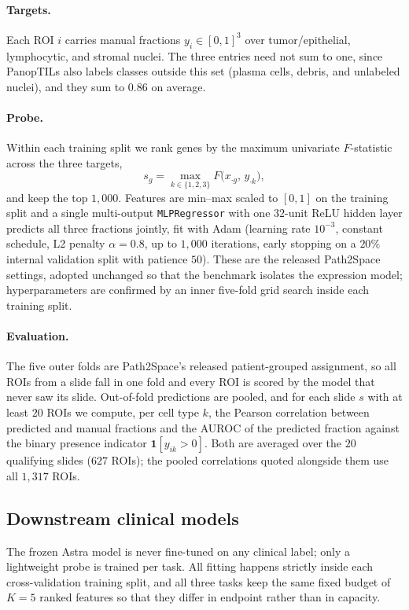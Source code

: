 \documentclass[11pt]{article}
\begin{document}
\paragraph{Targets.} Each ROI $i$ carries manual fractions
$y_i\in[0,1]^3$ over tumor/epithelial, lymphocytic, and stromal nuclei. The three
entries need not sum to one, since PanopTILs also labels classes outside this set
(plasma cells, debris, and unlabeled nuclei), and they sum to $0.86$ on average.

\paragraph{Probe.} Within each training split we rank genes by the maximum
univariate $F$-statistic across the three targets,
\[
s_g=\max_{k\in\{1,2,3\}} F\big(x_{\cdot g},\,y_{\cdot k}\big),
\]
and keep the top $1{,}000$. Features are min--max scaled to $[0,1]$ on the
training split and a single multi-output \texttt{MLPRegressor} with one
$32$-unit ReLU hidden layer predicts all three fractions jointly, fit with Adam
(learning rate $10^{-3}$, constant schedule, L2 penalty $\alpha=0.8$, up to
$1{,}000$ iterations, early stopping on a $20\%$ internal validation split with
patience $50$). These are the released Path2Space settings, adopted unchanged so
that the benchmark isolates the expression model; hyperparameters are confirmed
by an inner five-fold grid search inside each training split.

\paragraph{Evaluation.} The five outer folds are Path2Space's released
patient-grouped assignment, so all ROIs from a slide fall in one fold and every
ROI is scored by the model that never saw its slide. Out-of-fold predictions are
pooled, and for each slide $s$ with at least $20$ ROIs we compute, per cell type
$k$, the Pearson correlation between predicted and manual fractions and the AUROC
of the predicted fraction against the binary presence indicator
$\mathbf{1}[y_{ik}>0]$. Both are averaged over the $20$ qualifying slides
($627$ ROIs); the pooled correlations quoted alongside them use all $1{,}317$
ROIs.

\subsection{Downstream clinical models}
\label{met:downstream}

The frozen Astra model is never fine-tuned on any clinical label; only a
lightweight probe is trained per task. All fitting happens strictly inside each
cross-validation training split, and all three tasks keep the same fixed budget
of $K=5$ ranked features so that they differ in endpoint rather than in capacity.
\end{document}
